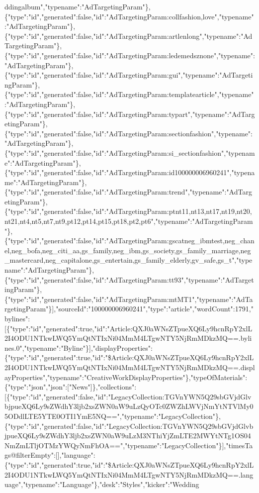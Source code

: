 ddingalbum","typename":"AdTargetingParam"\},\{"type":"id","generated":false,"id":"AdTargetingParam:collfashion,love","typename":"AdTargetingParam"\},\{"type":"id","generated":false,"id":"AdTargetingParam:artlenlong","typename":"AdTargetingParam"\},\{"type":"id","generated":false,"id":"AdTargetingParam:ledemedsznone","typename":"AdTargetingParam"\},\{"type":"id","generated":false,"id":"AdTargetingParam:gui","typename":"AdTargetingParam"\},\{"type":"id","generated":false,"id":"AdTargetingParam:templatearticle","typename":"AdTargetingParam"\},\{"type":"id","generated":false,"id":"AdTargetingParam:typart","typename":"AdTargetingParam"\},\{"type":"id","generated":false,"id":"AdTargetingParam:sectionfashion","typename":"AdTargetingParam"\},\{"type":"id","generated":false,"id":"AdTargetingParam:si\_sectionfashion","typename":"AdTargetingParam"\},\{"type":"id","generated":false,"id":"AdTargetingParam:id100000006960241","typename":"AdTargetingParam"\},\{"type":"id","generated":false,"id":"AdTargetingParam:trend","typename":"AdTargetingParam"\},\{"type":"id","generated":false,"id":"AdTargetingParam:ptnt11,nt13,nt17,nt19,nt20,nt21,nt4,nt5,nt7,nt9,pt12,pt14,pt15,pt18,pt2,pt6","typename":"AdTargetingParam"\},\{"type":"id","generated":false,"id":"AdTargetingParam:gscatneg\_ibmtest,neg\_chanel,neg\_bofa,neg\_citi\_aa,gs\_family,neg\_ibm,gs\_society,gs\_family\_marriage,neg\_mastercard,neg\_capitalone,gs\_entertain,gs\_family\_elderly,gv\_safe,gs\_t","typename":"AdTargetingParam"\},\{"type":"id","generated":false,"id":"AdTargetingParam:tt93","typename":"AdTargetingParam"\},\{"type":"id","generated":false,"id":"AdTargetingParam:mtMT1","typename":"AdTargetingParam"\}{]},"sourceId":"100000006960241","type":"article","wordCount":1791,"bylines":{[}\{"type":"id","generated":true,"id":"Article:QXJ0aWNsZTpueXQ6Ly9hcnRpY2xlL2I4ODU1NTkwLWQ5YmQtNTIxNi04MmM4LTgwNTY5NjRmMDkzMQ==.bylines.0","typename":"Byline"\}{]},"displayProperties":\{"type":"id","generated":true,"id":"\$Article:QXJ0aWNsZTpueXQ6Ly9hcnRpY2xlL2I4ODU1NTkwLWQ5YmQtNTIxNi04MmM4LTgwNTY5NjRmMDkzMQ==.displayProperties","typename":"CreativeWorkDisplayProperties"\},"typeOfMaterials":\{"type":"json","json":{[}"News"{]}\},"collections":{[}\{"type":"id","generated":false,"id":"LegacyCollection:TGVnYWN5Q29sbGVjdGlvbjpueXQ6Ly9sZWdhY3ljb2xsZWN0aW9uLzQyOTc0ZWZhLWVjNmYtNTVlMy05ODdlLTE5YTE0OTI1YmE5NQ==","typename":"LegacyCollection"\},\{"type":"id","generated":false,"id":"LegacyCollection:TGVnYWN5Q29sbGVjdGlvbjpueXQ6Ly9sZWdhY3ljb2xsZWN0aW9uLzM3NThiYjZmLTE2MWYtNTg1OS04NmZmLTljOTMzYWQyNmFhOA==","typename":"LegacyCollection"\}{]},"timesTags@filterEmpty":{[}{]},"language":\{"type":"id","generated":true,"id":"\$Article:QXJ0aWNsZTpueXQ6Ly9hcnRpY2xlL2I4ODU1NTkwLWQ5YmQtNTIxNi04MmM4LTgwNTY5NjRmMDkzMQ==.language","typename":"Language"\},"desk":"Styles","kicker":"Wedding
